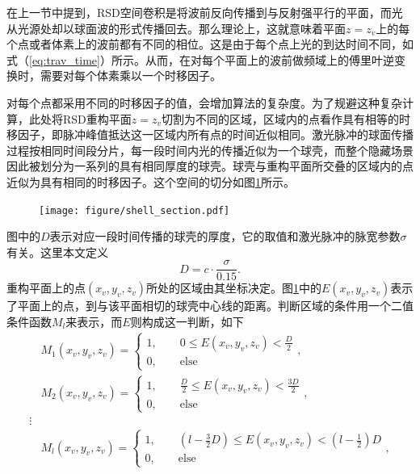 \documentclass[master]{shtthesis}             %
\begin{document}
在上一节中提到，RSD空间卷积是将波前反向传播到与反射强平行的平面，而光从光源处却以球面波的形式传播回去。那么理论上，这就意味着平面$z=z_v$上的每个点或者体素上的波前都有不同的相位。这是由于每个点上光的到达时间不同，如式（\ref{eq:trav_time}）所示。从而，在对每个平面上的波前做频域上的傅里叶逆变换时，需要对每个体素乘以一个时移因子。

对每个点都采用不同的时移因子的值，会增加算法的复杂度。为了规避这种复杂计算，此处将RSD重构平面$z=z_v$切割为不同的区域，区域内的点看作具有相等的时移因子，即脉冲峰值抵达这一区域内所有点的时间近似相同。激光脉冲的球面传播过程按相同时间段分片，每一段时间内光的传播近似为一个球壳，而整个隐藏场景因此被划分为一系列的具有相同厚度的球壳。球壳与重构平面所交叠的区域内的点近似为具有相同的时移因子。这个空间的切分如图\ref{fig:shell_sect}所示。
\begin{figure}[!tb]
  \centering
  \texttt{[image: figure/shell\_section.pdf]}
  \label{fig:shell_sect}
\end{figure}  
图中的$D$表示对应一段时间传播的球壳的厚度，它的取值和激光脉冲的脉宽参数$\sigma$有关。这里本文定义
\begin{equation}
  D = c\cdot \frac{\sigma}{0.15} .
\end{equation}
重构平面上的点$(x_v,y_v,z_v)$所处的区域由其坐标决定。图\ref{fig:shell_sect}中的$E(x_v,y_v,z_v)$表示了平面上的点，到与该平面相切的球壳中心线的距离。判断区域的条件用一个二值条件函数$M_l$来表示，而$E$则构成这一判断，如下
\begin{equation}
  \begin{split}
    &M_1(x_v,y_v,z_v) = \begin{cases}
      1,\qquad 0 \leq E(x_v,y_v,z_v) < \frac{D}{2} \\
      0,\qquad \text{else} 
    \end{cases}, \\
    &M_2(x_v,y_v,z_v) = \begin{cases}
      1,\qquad \frac{D}{2} \leq E(x_v,y_v,z_v) < \frac{3D}{2} \\
      0,\qquad \text{else}
    \end{cases}, \\
    \vdots \\
    &M_l(x_v,y_v,z_v) = \begin{cases}
      1,\qquad (l-\frac{3}{2}D) \leq E(x_v,y_v,z_v) < (l-\frac{1}{2})D \\
      0,\qquad \text{else}
    \end{cases}, 
  \end{split}
\end{equation}
\end{document}
